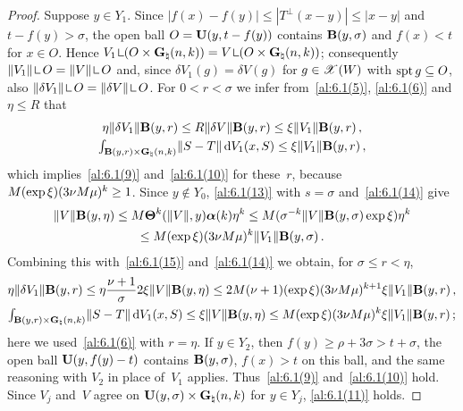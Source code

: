 \begin{proof}
    Suppose $y \in Y_1$. Since $|f(x) - f(y)| \le |T^\perp(x - y)| \le |x - y|$ and $t - f(y) >
    \sigma$, the open ball $O = \mathbf{U}(y,t - f(y))$ contains $\mathbf{B}(y,\sigma)$ and $f(x) < t$
    for $x \in O$. Hence $V_1 \restrict (O \times \pgrass{\adim}{\vdim}) = V \restrict (O \times
    \pgrass{\adim}{\vdim})$; consequently $\|V_1\| \restrict O = \|V\| \restrict O$ and, since
    $\delta V_1(g) = \delta V(g)$ for $g \in \mathscr{X}(W)$ with $\operatorname{spt} g \subseteq O$, also $\|\delta
    V_1\| \restrict O = \|\delta V\| \restrict O$. For $0 < r < \sigma$ we infer
    from~\ref{al:6.1(5)}, \ref{al:6.1(6)} and $\eta \le R$ that
    \begin{gather*}
        \eta \|\delta V_1\| \mathbf{B}(y,r) \le R \|\delta V\| \mathbf{B}(y,r) \le \xi \|V_1\|
        \mathbf{B}(y,r) \,, \\ {\textstyle\int_{\mathbf{B}(y,r) \times \mathbf{G}_{\natural}(n,k)}^{}} \|S - T\| \,\mathrm{d}
        V_1(x,S) \le \xi \|V_1\| \mathbf{B}(y,r) \,,
    \end{gather*}
    which implies~\ref{al:6.1(9)} and~\ref{al:6.1(10)} for these~$r$, because $M (\exp \xi) (3 \nu
    M \mu)^{k} \ge 1$. Since $y \notin Y_0$, \eqref{al:6.1(13)} with $s = \sigma$
    and~\eqref{al:6.1(14)} give
    \begin{multline*}
        \|V\| \mathbf{B}(y,\eta) \le M \boldsymbol{\Theta}^{k}(\|V\|,y) \boldsymbol{\alpha}(k) \eta^{k}
        \le M (\sigma^{-k} \|V\| \mathbf{B}(y,\sigma) \exp \xi) \eta^{k} \\ \le M (\exp \xi) (3
        \nu M \mu)^{k} \|V_1\| \mathbf{B}(y,\sigma) \,.
    \end{multline*}
    Combining this with~\eqref{al:6.1(15)} and~\eqref{al:6.1(14)} we obtain, for $\sigma \le r <
    \eta$,
    \begin{gather*}
        \eta \|\delta V_1\| \mathbf{B}(y,r) \le \eta \frac{\nu+1}{\sigma} 2 \xi \|V\|
        \mathbf{B}(y,\eta) \le 2 M (\nu + 1) (\exp \xi) (3 \nu M \mu)^{k + 1} \xi \|V_1\|
        \mathbf{B}(y,r) \,, \\
        {\textstyle\int_{\mathbf{B}(y,r) \times \mathbf{G}_{\natural}(n,k)}^{}} \|S - T\| \,\mathrm{d} V_1(x,S) \le \xi
        \|V\| \mathbf{B}(y,\eta) \le M (\exp \xi) (3 \nu M \mu)^{k} \xi \|V_1\| \mathbf{B}(y,r)
        \,;
    \end{gather*}
    here we used~\ref{al:6.1(6)} with $r = \eta$. If $y \in Y_2$, then $f(y) \ge \rho + 3 \sigma >
    t + \sigma$, the open ball $\mathbf{U}(y,f(y) - t)$ contains $\mathbf{B}(y,\sigma)$, $f(x) > t$ on
    this ball, and the same reasoning with $V_2$ in place of~$V_1$ applies. Thus~\ref{al:6.1(9)}
    and~\ref{al:6.1(10)} hold. Since $V_j$ and~$V$ agree on $\mathbf{U}(y,\sigma) \times
    \mathbf{G}_{\natural}(n,k)$ for $y \in Y_j$, \ref{al:6.1(11)} holds.


\end{proof}
